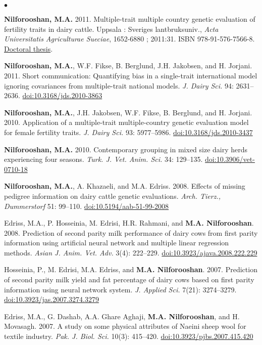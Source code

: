 \documentclass[margin,line]{res}
\newenvironment{list2}{
  \begin{list}{$\bullet$}{%
      \setlength{\itemsep}{0in}
      \setlength{\parsep}{0in} \setlength{\parskip}{0in}
      \setlength{\topsep}{0in} \setlength{\partopsep}{0in}
      \setlength{\leftmargin}{0.2in}}}{\end{list}}
\begin{document}
\begin{resume}
\begin{list2}
\item {\bf Nilforooshan, M.A.} 2011. Multiple-trait multiple country genetic evaluation of fertility traits in dairy cattle. Uppsala : Sveriges lantbruksuniv., {\em Acta Universitatis Agriculturae Sueciae}, 1652-6880 ; 2011:31. ISBN 978-91-576-7566-8. \href{https://pub.epsilon.slu.se/8094}{Doctoral thesis}.
\item {\bf Nilforooshan, M.A.}, W.F. Fikse, B. Berglund, J.H. Jakobsen, and H. Jorjani. 2011. Short communication: Quantifying bias in a single-trait international model ignoring covariances from multiple-trait national models. {\em J. Dairy Sci.} 94: 2631--2636. \href{https://doi.org/10.3168/jds.2010-3863}{doi:10.3168/jds.2010-3863}
\item {\bf Nilforooshan, M.A.}, J.H. Jakobsen, W.F. Fikse, B. Berglund, and H. Jorjani. 2010. Application of a multiple-trait multiple-country genetic evaluation model for female fertility traits. {\em J. Dairy Sci.} 93: 5977--5986. \href{https://doi.org/10.3168/jds.2010-3437}{doi:10.3168/jds.2010-3437}
\item {\bf Nilforooshan, M.A.} 2010. Contemporary grouping in mixed size dairy herds experiencing four seasons. {\em Turk. J. Vet. Anim. Sci.} 34: 129--135. \href{https://doi.org/10.3906/vet-0710-18}{doi:10.3906/vet-0710-18}
\item {\bf Nilforooshan, M.A.}, A. Khazaeli, and M.A. Edriss. 2008. Effects of missing pedigree information on dairy cattle genetic evaluations. {\em Arch. Tierz., Dummerstorf} 51: 99--110. \href{https://doi.org/10.5194/aab-51-99-2008}{doi:10.5194/aab-51-99-2008}
\item Edriss, M.A., P. Hosseinia, M. Edrisi, H.R. Rahmani, and {\bf M.A. Nilforooshan}. 2008. Prediction of second parity milk performance of dairy cows from first parity information using artificial neural network and multiple linear regression methods. {\em Asian J. Anim. Vet. Adv.} 3(4): 222--229. \href{https://doi.org/10.3923/ajava.2008.222.229}{doi:10.3923/ajava.2008.222.229}
\item Hosseinia, P., M. Edrisi, M.A. Edriss, and {\bf M.A. Nilforooshan}. 2007. Prediction of second parity milk yield and fat percentage of dairy cows based on first parity information using neural network system. {\em J. Applied Sci.} 7(21): 3274--3279. \href{https://doi.org/10.3923/jas.2007.3274.3279}{doi:10.3923/jas.2007.3274.3279}
\item Edriss, M.A., G. Dashab, A.A. Ghare Aghaji, {\bf M.A. Nilforooshan}, and H. Movasagh. 2007. A study on some physical attributes of Naeini sheep wool for textile industry. {\em Pak. J. Biol. Sci.} 10(3): 415--420. \href{https://doi.org/10.3923/pjbs.2007.415.420}{doi:10.3923/pjbs.2007.415.420}

\end{list2}
\end{resume}
\end{document}
